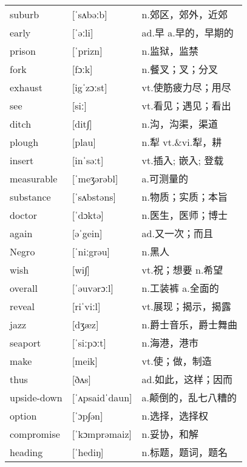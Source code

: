 \documentclass[a4paper]{article}
\begin{document}
\section{}
\begin{tabular}{l l l}

suburb & [ˈsʌbəːb] & n.郊区，郊外，近郊 \\
early & [ˈəːli] & ad.早 a.早的，早期的 \\
prison & [ˈprizn] & n.监狱，监禁 \\
fork & [fɔːk] & n.餐叉；叉；分叉 \\
exhaust & [igˈzɔːst] & vt.使筋疲力尽；用尽 \\
see & [siː] & vt.看见；遇见；看出 \\
ditch & [dit∫] & n.沟，沟渠，渠道 \\
plough & [plau] & n.犁 vt.\&vi.犁，耕 \\
insert & [inˈsəːt] & vt.插入; 嵌入; 登载 \\
measurable & [ˈmeʒərəbl] & a.可测量的 \\
substance & [ˈsʌbstəns] & n.物质；实质；本旨 \\
doctor & [ˈdɔktə] & n.医生，医师；博士 \\
again & [əˈgein] & ad.又一次；而且 \\
Negro & [ˈniːgrəu] & n.黑人 \\
wish & [wi∫] & vt.祝；想要 n.希望 \\
overall & [ˈəuvərɔːl] & n.工装裤 a.全面的 \\
reveal & [riˈviːl] & vt.展现；揭示，揭露 \\
jazz & [dʒæz] & n.爵士音乐，爵士舞曲 \\
seaport & [ˈsiːpɔːt] & n.海港，港市 \\
make & [meik] & vt.使；做，制造 \\
thus & [ðʌs] & ad.如此，这样；因而 \\
upside-down & [ˈʌpsaidˈdaun] & a.颠倒的，乱七八糟的 \\
option & [ˈɔp∫ən] & n.选择，选择权 \\
compromise & [ˈkɔmprəmaiz] & n.妥协，和解 \\
heading & [ˈhediŋ] & n.标题，题词，题名 \\

\end{tabular}
\end{document}
